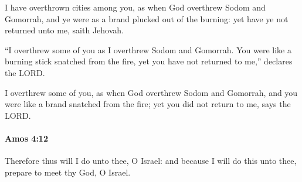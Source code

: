 			\begin{versebox}
					\item[BHS] 
					\item[LXX] 
					\item[ASV] I have overthrown cities among you, as when God overthrew Sodom and Gomorrah, and ye were as a brand plucked out of the burning: yet have ye not returned unto me, saith Jehovah.
					\item[NIV] “I overthrew some of you as I overthrew Sodom and Gomorrah. You were like a burning stick snatched from the fire, yet you have not returned to me,” declares the LORD.
					\item[NRSV] I overthrew some of you, as when God overthrew Sodom and Gomorrah, and you were like a brand snatched from the fire; yet you did not return to me, says the LORD.
			\end{versebox}

		\paragraph{Amos 4:12} %
			\label{AMOS-4-12}

			Therefore thus will I do unto thee, O Israel: and because I will do this unto thee, prepare to meet thy God, O Israel.

